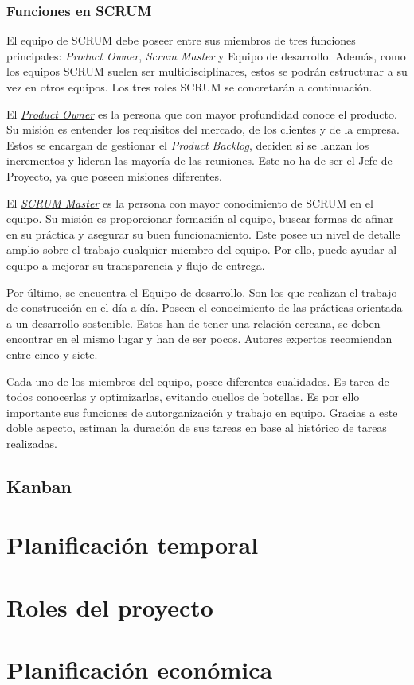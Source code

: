 \subsubsection{Funciones en SCRUM}
El equipo de SCRUM debe poseer entre sus miembros de tres funciones principales: \textit{Product Owner}, \textit{Scrum Master} y Equipo de desarrollo. Además, como los equipos SCRUM suelen ser multidisciplinares, estos se podrán estructurar a su vez en otros equipos. Los tres roles SCRUM se concretarán a continuación.

El \underline{\textit{Product Owner}} es la persona que con mayor profundidad conoce el producto. Su misión es entender los requisitos del mercado, de los clientes y de la empresa. Estos se encargan de gestionar el \textit{Product Backlog}, deciden si se lanzan los incrementos y lideran las mayoría de las reuniones. Este no ha de ser el Jefe de Proyecto, ya que poseen misiones diferentes.

El \underline{\textit{SCRUM Master}} es la persona con mayor conocimiento de SCRUM en el equipo. Su misión es proporcionar formación al equipo, buscar formas de afinar en su práctica y asegurar su buen funcionamiento. Este posee un nivel de detalle amplio sobre el trabajo cualquier miembro del equipo. Por ello, puede ayudar al equipo a mejorar su transparencia y flujo de entrega.

Por último, se encuentra el \underline{Equipo de desarrollo}. Son los que realizan el trabajo de construcción en el día a día. Poseen el conocimiento de las prácticas orientada a un desarrollo sostenible. Estos han de tener una relación cercana, se deben encontrar en el mismo lugar y han de ser pocos. Autores expertos recomiendan entre cinco y siete.

Cada uno de los miembros del equipo, posee diferentes cualidades. Es tarea de todos conocerlas y optimizarlas, evitando cuellos de botellas. Es por ello importante sus funciones de autorganización y trabajo en equipo. Gracias a este doble aspecto, estiman la duración de sus tareas en base al histórico de tareas realizadas.


\subsection{Kanban}

\section{Planificación temporal}\label{sec:planificacion_temporal}

\section{Roles del proyecto}\label{sec:roles_proyecto}

\section{Planificación económica}\label{sec:planificacion_economica}